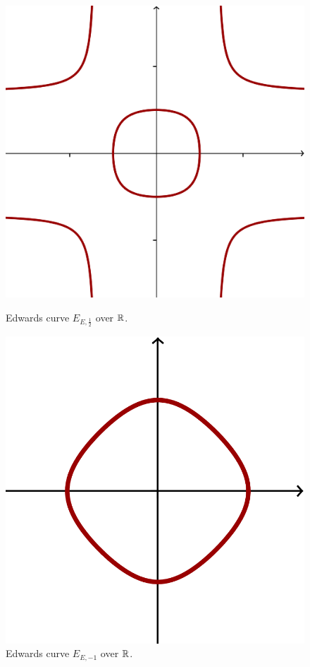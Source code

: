 \begin{figure}[h]
\begin{minipage}[b]{0.5\linewidth}
\centering
\includegraphics[scale=0.5]{edwards_curve_positive_proper.png}
\caption{Edwards curve $E_{E,\frac{1}{2}}$ over $\mathbb{R}$.}
\end{minipage}
\hspace{0.5cm}
\begin{minipage}[b]{0.5\linewidth}
\centering
\includegraphics[scale=1]{edwards_curve_minus_one.png}
\caption{Edwards curve $E_{E,-1}$ over $\mathbb{R}$.}
\end{minipage}
\end{figure}
